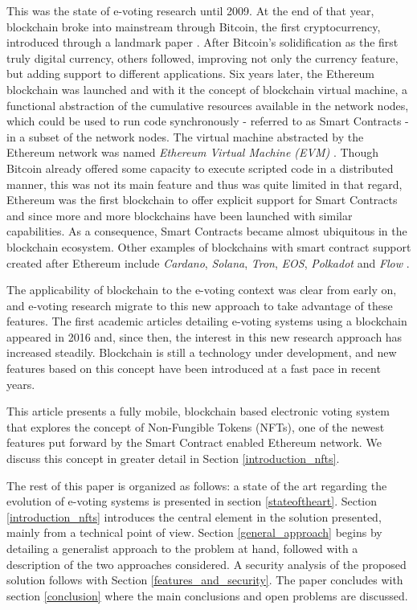 \documentclass[../main.tex]{subfiles}
\begin{document}
    \par
    This was the state of e-voting research until 2009. At the end of that year, blockchain broke into mainstream through Bitcoin, the first cryptocurrency, introduced through a landmark paper \cite{Nakamoto2008}. After Bitcoin's solidification as the first truly digital currency, others followed, improving not only the currency feature, but adding support to different applications. Six years later, the Ethereum blockchain \cite{Dannen2016} was launched and with it the concept of blockchain virtual machine, a functional abstraction of the cumulative resources available in the network nodes, which could be used to run code synchronously - referred to as Smart Contracts - in a subset of the network nodes. The virtual machine abstracted by the Ethereum network was named \textit{Ethereum Virtual Machine (EVM)} \cite{Antonopoulos2018}. Though Bitcoin already offered some capacity to execute scripted code in a distributed manner, this was not its main feature and thus was quite limited in that regard, Ethereum was the first blockchain to offer explicit support for Smart Contracts and since more and more blockchains have been launched with similar capabilities. As a consequence, Smart Contracts became almost ubiquitous in the blockchain ecosystem. Other examples of blockchains with smart contract support created after Ethereum include \textit{Cardano}, \textit{Solana}, \textit{Tron}, \textit{EOS}, \textit{Polkadot} and \textit{Flow} \cite{cointree2022}. 
    \par
    The applicability of blockchain to the e-voting context was clear from early on, and e-voting research migrate to this new approach to take advantage of these features. The first academic articles detailing e-voting systems using a blockchain appeared in 2016 and, since then, the interest in this new research approach has increased steadily. Blockchain is still a technology under development, and new features based on this concept have been introduced at a fast pace in recent years.
    \par
    This article presents a fully mobile, blockchain based electronic voting system that explores the concept of Non-Fungible Tokens (NFTs), one of the newest features put forward by the Smart Contract enabled Ethereum network. We discuss this concept in greater detail in Section \ref{introduction_nfts}.
    \par
    The rest of this paper is organized as follows: a state of the art regarding the evolution of e-voting systems is presented in section \ref{stateoftheart}. Section \ref{introduction_nfts} introduces the central element in the solution presented, mainly from a technical point of view. Section \ref{general_approach} begins by detailing a generalist approach to the problem at hand, followed with a description of the two approaches considered. A security analysis of the proposed solution follows with Section \ref{features_and_security}. The paper concludes with section \ref{conclusion} where the main conclusions and open problems are discussed.
\end{document}
